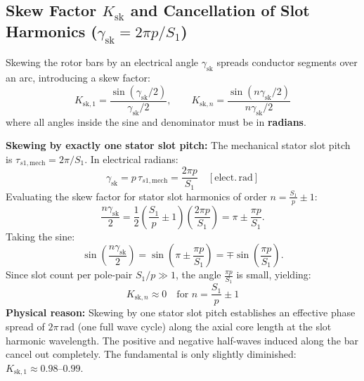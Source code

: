 \subsection{Skew Factor \texorpdfstring{$K_{\mathrm{sk}}$}{K(sk)} and Cancellation of Slot Harmonics (\texorpdfstring{$\gamma_{\mathrm{sk}} = 2\pi p / S_1$}{gamma(sk) = 2pi p / S1})}
Skewing the rotor bars by an electrical angle $\gamma_{\mathrm{sk}}$ spreads conductor segments over an arc, introducing a skew factor:
\begin{equation}
\boxed{K_{\mathrm{sk},1} = \frac{\sin(\gamma_{\mathrm{sk}}/2)}{\gamma_{\mathrm{sk}}/2}, \qquad K_{\mathrm{sk},n} = \frac{\sin(n\gamma_{\mathrm{sk}}/2)}{n\gamma_{\mathrm{sk}}/2}}
\end{equation}
where all angles inside the sine and denominator must be in \textbf{radians}.

\textbf{Skewing by exactly one stator slot pitch:}
The mechanical stator slot pitch is $\tau_{s1,\mathrm{mech}} = 2\pi / S_1$. In electrical radians:
\begin{equation}
\boxed{\gamma_{\mathrm{sk}} = p\,\tau_{s1,\mathrm{mech}} = \frac{2\pi p}{S_1} \quad [\mathrm{elect.\,rad}]}
\end{equation}
Evaluating the skew factor for stator slot harmonics of order $n = \frac{S_1}{p}\pm 1$:
\begin{equation}
\frac{n\gamma_{\mathrm{sk}}}{2} = \frac{1}{2}\left(\frac{S_1}{p}\pm 1\right)\left(\frac{2\pi p}{S_1}\right) = \pi \pm \frac{\pi p}{S_1}.
\end{equation}
Taking the sine:
\begin{equation}
\sin\left(\frac{n\gamma_{\mathrm{sk}}}{2}\right) = \sin\left(\pi \pm \frac{\pi p}{S_1}\right) = \mp\sin\left(\frac{\pi p}{S_1}\right).
\end{equation}
Since slot count per pole-pair $S_1/p \gg 1$, the angle $\frac{\pi p}{S_1}$ is small, yielding:
\begin{equation}
\boxed{K_{\mathrm{sk},n} \approx 0 \quad \text{for } n = \frac{S_1}{p}\pm 1}
\end{equation}
\textbf{Physical reason:} Skewing by one stator slot pitch establishes an effective phase spread of $2\pi\,\mathrm{rad}$ (one full wave cycle) along the axial core length at the slot harmonic wavelength. The positive and negative half-waves induced along the bar cancel out completely.
The fundamental is only slightly diminished: $K_{\mathrm{sk},1} \approx 0.98\text{--}0.99$.

